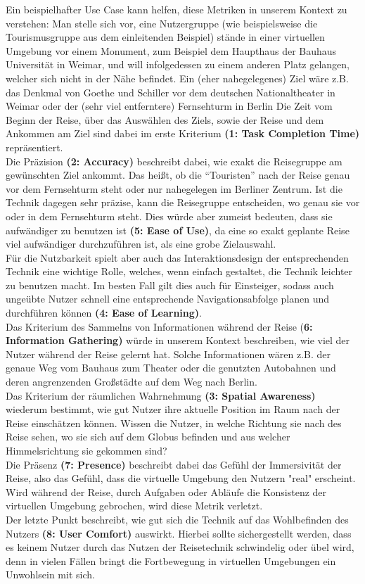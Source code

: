 Ein beispielhafter Use Case kann helfen, diese Metriken in unserem Kontext zu verstehen:
Man stelle sich vor, eine Nutzergruppe (wie beispielsweise die Tourismusgruppe aus dem einleitenden Beispiel) stände in einer virtuellen Umgebung vor einem Monument, zum Beispiel dem Haupthaus der Bauhaus Universität in Weimar, und will infolgedessen zu einem anderen Platz gelangen, welcher sich nicht in der Nähe befindet. Ein (eher nahegelegenes) Ziel wäre z.B. das Denkmal von Goethe und Schiller vor dem deutschen Nationaltheater in Weimar oder der (sehr viel entferntere) Fernsehturm in Berlin
Die Zeit vom Beginn der Reise, über das Auswählen des Ziels, sowie der Reise und dem Ankommen am Ziel sind dabei im erste Kriterium \textbf{(1: Task Completion Time)} repräsentiert.\\
Die Präzision \textbf{(2: Accuracy)} beschreibt dabei, wie exakt die Reisegruppe am gewünschten Ziel ankommt. Das heißt, ob die “Touristen” nach der Reise genau vor dem Fernsehturm steht oder nur nahegelegen im Berliner Zentrum. Ist die Technik dagegen sehr präzise, kann die Reisegruppe entscheiden, wo genau sie vor oder in dem Fernsehturm steht. Dies würde aber zumeist bedeuten, dass sie aufwändiger zu benutzen ist \textbf{(5: Ease of Use)}, da eine so exakt geplante Reise viel aufwändiger durchzuführen ist, als eine grobe Zielauswahl.\\
Für die Nutzbarkeit spielt aber auch das Interaktionsdesign der entsprechenden Technik eine wichtige Rolle, welches, wenn einfach gestaltet, die Technik leichter zu benutzen macht. Im besten Fall gilt dies auch für Einsteiger, sodass auch ungeübte Nutzer schnell eine entsprechende Navigationsabfolge planen und durchführen können \textbf{(4: Ease of Learning)}.\\
Das Kriterium des Sammelns von Informationen während der Reise (\textbf{6: Information Gathering)} würde in unserem Kontext beschreiben, wie viel der Nutzer während der Reise gelernt hat. Solche Informationen wären z.B. der genaue Weg vom Bauhaus zum Theater oder die genutzten Autobahnen und deren angrenzenden Großstädte auf dem Weg nach Berlin.\\
Das Kriterium der räumlichen Wahrnehmung \textbf{(3: Spatial Awareness)} wiederum bestimmt, wie gut Nutzer ihre aktuelle Position im Raum nach der Reise einschätzen können. Wissen die Nutzer, in welche Richtung sie nach des Reise sehen, wo sie sich auf dem Globus befinden und aus welcher Himmelsrichtung sie gekommen sind?\\
Die Präsenz \textbf{(7: Presence)} beschreibt dabei das Gefühl der Immersivität der Reise, also das Gefühl, dass die virtuelle Umgebung den Nutzern "real" erscheint. Wird während der Reise, durch Aufgaben oder Abläufe die Konsistenz der virtuellen Umgebung gebrochen, wird diese Metrik verletzt.\\
Der letzte Punkt beschreibt, wie gut sich die Technik auf das Wohlbefinden des Nutzers \textbf{(8: User Comfort)} auswirkt. Hierbei sollte sichergestellt werden, dass es keinem Nutzer durch das Nutzen der Reisetechnik schwindelig oder übel wird, denn in vielen Fällen bringt die Fortbewegung in virtuellen Umgebungen ein Unwohlsein mit sich.


